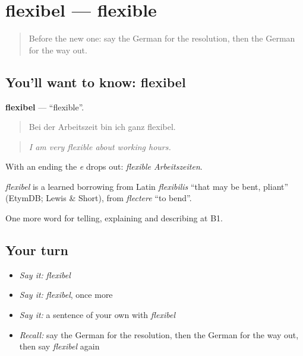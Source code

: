 \section[flexibel]{flexibel — flexible}

\label{lesson:GE-C374-flexibel}



\begin{quote}
Before the new one: say the German for the resolution, then the German for the way out.
\end{quote}

\subsection*{You'll want to know: flexibel}
\textbf{flexibel} — \textquotedblleft{}flexible\textquotedblright{}.

\begin{quote}
Bei der Arbeitszeit bin ich ganz flexibel.
\end{quote}

\begin{quote}
\emph{I am very flexible about working hours.}
\end{quote}

With an ending the \emph{e} drops out: \emph{flexible Arbeitszeiten}.

\begin{cousinweb}
\emph{flexibel} is a learned borrowing from Latin \emph{flexibilis} \textquotedblleft{}that may be bent, pliant\textquotedblright{} (EtymDB; Lewis \& Short), from \emph{flectere} \textquotedblleft{}to bend\textquotedblright{}.
\end{cousinweb}

\begin{grammarlens}[title={What you've built}]
One more word for telling, explaining and describing at B1.
\end{grammarlens}

\subsection*{Your turn}
\begin{itemize}
\raggedright
  \item \emph{Say it:} \emph{flexibel}
  \item \emph{Say it:} \emph{flexibel}, once more
  \item \emph{Say it:} a sentence of your own with \emph{flexibel}
  \item \emph{Recall:} say the German for the resolution, then the German for the way out, then say \emph{flexibel} again
\end{itemize}

